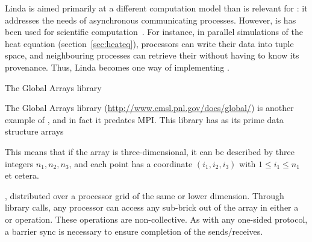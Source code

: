 Linda is aimed primarily at a different computation model than is
relevant for : it addresses the needs of
asynchronous communicating processes. However, is has been used for
scientific computation~\cite{Deshpande92efficientparallel}. For
instance, in parallel simulations of the heat equation
(section~\ref{sec:heateq}), processors can write their data into tuple
space, and neighbouring processes can retrieve their  without having to
know its provenance. Thus, Linda becomes one way of implementing
.


 {The Global Arrays library}

The Global Arrays library (\url{http://www.emsl.pnl.gov/docs/global/})
is another example of , and in fact
it predates MPI. This library has as its prime data structure
 arrays
\begin{footnoteenv}
  {This means that if the
  array is three-dimensional, it can be described by three integers
  $n_1,n_2,n_3$, and each point has a coordinate $(i_1,i_2,i_3)$ with
  $1\leq i_1\leq n_1$ et cetera.}
\end{footnoteenv}
, distributed over a processor grid
of the same or lower dimension. Through library calls, any processor
can access any sub-brick out of the array in either a  or
 operation. These operations are non-collective. As with any
one-sided protocol, a barrier sync is necessary to ensure completion
of the sends/receives.


